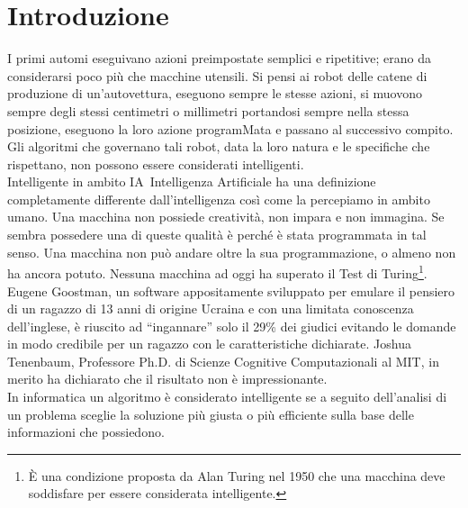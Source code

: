 \chapter*{Introduzione}
\fancyfoot[C]{\thepage } 
I primi automi eseguivano azioni preimpostate semplici e ripetitive; erano da considerarsi poco 
più che macchine utensili. Si pensi ai robot delle catene di produzione di un'autovettura, 
eseguono sempre le stesse azioni, si muovono sempre degli stessi centimetri o millimetri 
portandosi sempre nella stessa posizione, eseguono la loro azione programMata 
e passano al successivo compito. Gli algoritmi che governano tali robot, data la 
loro natura e le specifiche che rispettano, non possono essere considerati intelligenti.\\
Intelligente in ambito IA\
{Intelligenza Artificiale} ha una definizione completamente differente 
dall'intelligenza così come la percepiamo in ambito umano. Una macchina non 
possiede creatività, non impara e non immagina. Se sembra possedere una di queste 
qualità è perché è stata programmata in tal senso. Una macchina non può andare oltre 
la sua programmazione, o almeno non ha ancora potuto. Nessuna macchina ad oggi ha superato 
il Test di Turing\footnote{È una condizione proposta da Alan Turing nel 1950 
che una macchina deve soddisfare per essere considerata intelligente.}. Eugene 
Goostman, un software appositamente sviluppato per emulare il pensiero 
di un ragazzo di 13 anni di origine Ucraina e con una limitata conoscenza dell'inglese,
è riuscito ad ``ingannare'' solo il 29\% dei giudici evitando le domande in modo 
credibile per un ragazzo con le caratteristiche dichiarate. Joshua Tenenbaum,
Professore Ph.D. di Scienze Cognitive Computazionali al MIT, in merito ha dichiarato che 
il risultato non è impressionante.\cite{eugene}\\
In informatica un algoritmo è considerato intelligente
se a seguito dell'analisi di un problema sceglie la soluzione più giusta o più efficiente 
sulla base delle informazioni che possiedono.

